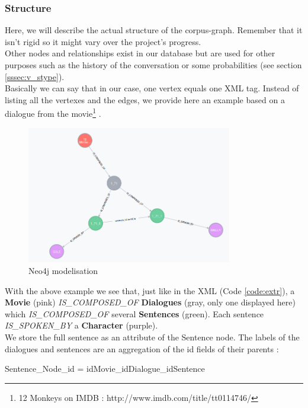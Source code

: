 \subsubsection{Structure}
Here, we will describe the actual structure of the corpus-graph. Remember that it isn't rigid so it might vary over the project's progress.\\
Other nodes and relationships exist in our database but are used for other purposes such as the history of the conversation or some probabilities (see section \ref{sssec:v_stype}).\\
Basically we can say that in our case, one vertex equals one XML tag. Instead of listing all the vertexes and the edges, we provide here an example based on a dialogue from the movie\footnote{12 Monkeys on IMDB : http://www.imdb.com/title/tt0114746/} .

\begin{figure}[!h]
\begin{center}
\includegraphics[width=0.8\textwidth]{./img/graph171.png}
\end{center}
\caption{Neo4j modelisation}
\label{fig:neoExtr}
\end{figure}
With the above example we see that, just like in the XML (Code \ref{code:extr}), a \textbf{Movie} (pink) \textit{IS\_COMPOSED\_OF} \textbf{Dialogues} (gray, only one displayed here) which \textit{IS\_COMPOSED\_OF} several \textbf{Sentences} (green). Each sentence \textit{IS\_SPOKEN\_BY} a \textbf{Character} (purple).\\
We store the full sentence as an attribute of the Sentence node. The labels of the dialogues and sentences are an aggregation of the id fields of their parents :
\begin{center}Sentence\_Node\_id = idMovie\_idDialogue\_idSentence \end{center}

